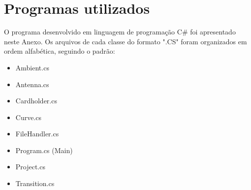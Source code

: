 
\chapter{Programas utilizados}

O programa desenvolvido em linguagem de programação C\# foi apresentado neste Anexo. Os arquivos de cada classe do formato ".CS" foram organizados em ordem alfabética, seguindo o padrão:

\begin{itemize}
    \item Ambient.cs
    \item Antenna.cs
    \item Cardholder.cs
    \item Curve.cs
    \item FileHandler.cs
    \item Program.cs (Main)
    \item Project.cs
    \item Transition.cs
\end{itemize}
